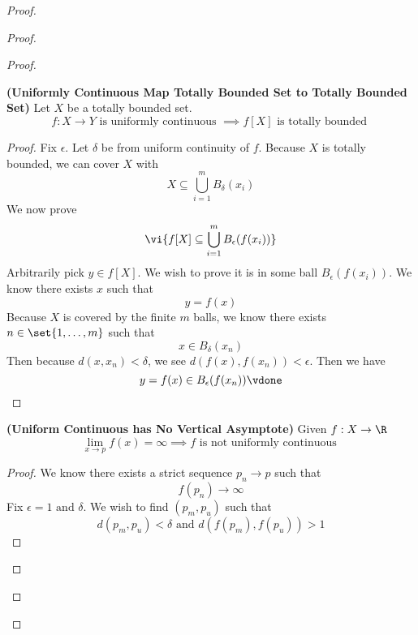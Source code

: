 \documentclass{report}
\begin{document}
\begin{proof}
\begin{proof}
\begin{proof}
\begin{theorem}
\label{5.4.5}
\textbf{(Uniformly Continuous Map Totally Bounded Set to Totally Bounded Set)} Let $X$ be a totally bounded set.
 \begin{equation*}
f:X\rightarrow Y\text{ is uniformly continuous }\implies f[X]\text{ is totally bounded }
\end{equation*}
\end{theorem}
\begin{proof}
Fix $\epsilon $. Let $\delta$ be from uniform continuity of $f$. Because $X$ is totally bounded, we can cover $X$ with 
 \begin{equation*}
X\subseteq \bigcup_{i=1}^m B_{\delta}(x_i)
\end{equation*}
We now prove 
\begin{equation*}
  \vi{f[X]\subseteq \bigcup_{i=1}^m B_\epsilon (f(x_i))}
\end{equation*}
Arbitrarily pick $y\in f[X]$. We wish to prove it is in some ball $B_\epsilon (f(x_i))$. We know there exists $x$ such that 
 \begin{equation*}
y=f(x)
\end{equation*}
Because $X$ is covered by the finite  $m $ balls, we know there exists $n\in \set{1,\dots ,m}$ such that 
\begin{equation*}
x\in B_{\delta}(x_n)
\end{equation*}
Then because $d(x,x_n)<\delta$, we see $d(f(x),f(x_n))<\epsilon $. Then we have 
\begin{equation*}
y=f(x)\in B_{\epsilon }(f(x_n))\vdone
\end{equation*}
\end{proof}
\begin{theorem}
\label{5.4.6}
\textbf{(Uniform Continuous has No Vertical Asymptote)} Given $f:X\rightarrow \R$
\begin{equation*}
\lim_{x \to p} f(x)=\infty \implies f\text{ is not uniformly continuous }
\end{equation*}
\end{theorem}
\begin{proof}
We know there exists a strict sequence $p_n \to p$ such that 
\begin{equation*}
f(p_n)\to \infty
\end{equation*}
Fix $\epsilon =1\text{ and }\delta$. We wish to find $(p_m,p_u)$ such that 
\begin{equation*}
d(p_m,p_u)<\delta\text{ and }d(f(p_m),f(p_u))>1
\end{equation*}

\end{proof}
\end{proof}
\end{proof}
\end{proof}
\end{document}
